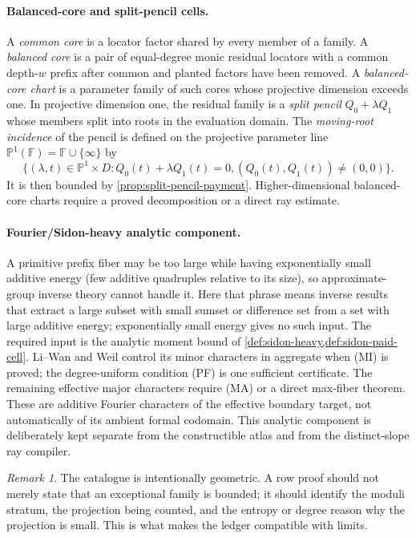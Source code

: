 \documentclass[12pt,a4paper]{amsart}
\numberwithin{equation}{section}
\theoremstyle{remark}
\newtheorem{remark}[remark]{Remark}
\newcommand{\F}{\mathbb F}
\newcommand{\Pj}{\mathbb P}
\begin{document}
\paragraph{Balanced-core and split-pencil cells.}
A \emph{common core} is a locator factor shared by every member of a
family.  A \emph{balanced core} is a pair of equal-degree monic residual
locators with a common depth-\(w\) prefix after common and planted factors
have been removed.  A \emph{balanced-core chart} is a parameter family of
such cores whose projective dimension exceeds one.  In projective
dimension one, the residual family is a \emph{split pencil}
\(Q_0+\lambda Q_1\) whose members split into roots in the evaluation
domain.  The \emph{moving-root incidence} of the pencil is
defined on the projective parameter line
\(\Pj^1(\F)=\F\cup\{\infty\}\) by
\[
 \{(\lambda,t)\in\Pj^1\times D:
        Q_0(t)+\lambda Q_1(t)=0,
        (Q_0(t),Q_1(t))\ne(0,0)\}.
\]
It is then bounded by
\cref{prop:split-pencil-payment}.  Higher-dimensional balanced-core charts
require a proved decomposition or a direct ray estimate.

\paragraph{Fourier/Sidon-heavy analytic component.}
A primitive prefix fiber may be too large while having exponentially small
additive energy (few additive quadruples relative to its size), so
approximate-group inverse theory cannot handle it.  Here that phrase means
inverse results that extract a large subset with small sumset or difference
set from a set with large additive energy; exponentially small energy gives
no such input.
The required input is the analytic moment bound of
\cref{def:sidon-heavy,def:sidon-paid-cell}.  Li--Wan and Weil control its
minor characters in aggregate when \textup{(MI)} is proved; the
degree-uniform condition \textup{(PF)} is one sufficient certificate.
The remaining effective major characters require \textup{(MA)} or a
direct max-fiber theorem.  These are additive Fourier characters of the
effective boundary target, not automatically of its ambient formal
codomain.  This analytic
component is deliberately kept separate from the constructible atlas and
from the distinct-slope ray compiler.

\begin{remark}
The catalogue is intentionally geometric.  A row proof should not merely state that an exceptional family is bounded; it should identify the moduli stratum, the projection being counted, and the entropy or degree reason why the projection is small.  This is what makes the ledger compatible with limits.
\end{remark}
\end{document}
